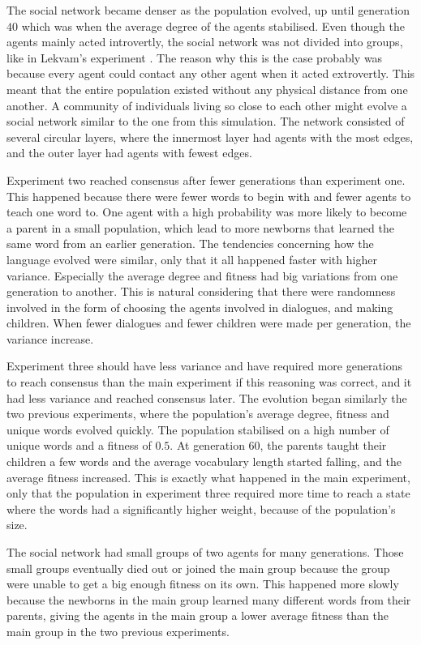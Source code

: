 The social network became denser as the population evolved, up until generation $40$ which was when the average degree of the agents stabilised. Even though the agents mainly acted introvertly, the social network was not divided into groups, like in Lekvam’s experiment \citep[Chapter 5, Section 1]{lekvam2014co}. The reason why this is the case probably was because every agent could contact any other agent when it acted extrovertly. This meant that the entire population existed without any physical distance from one another. A community of individuals living so close to each other might evolve a social network similar to the one from this simulation. The network consisted of several circular layers, where the innermost layer had agents with the most edges, and the outer layer had agents with fewest edges.

Experiment two reached consensus after fewer generations than experiment one. This happened because there were fewer words to begin with and fewer agents to teach one word to. One agent with a high probability was more likely to become a parent in a small population, which lead to more newborns that learned the same word from an earlier generation. The tendencies concerning how the language evolved were similar, only that it all happened faster with higher variance. Especially the average degree and fitness had big variations from one generation to another. This is natural considering that there were randomness involved in the form of choosing the agents involved in dialogues, and making children. When fewer dialogues and fewer children were made per generation, the variance increase.

Experiment three should have less variance and have required more generations to reach consensus than the main experiment if this reasoning was correct, and it had less variance and reached consensus later. The evolution began similarly the two previous experiments, where the population's average degree, fitness and unique words evolved quickly. The population stabilised on a high number of unique words and a fitness of $0.5$. At generation 60, the parents taught their children a few words and the average vocabulary length started falling, and the average fitness increased. This is exactly what happened in the main experiment, only that the population in experiment three required more time to reach a state where the words had a significantly higher weight, because of the population’s size. 

The social network had small groups of two agents for many generations. Those small groups eventually died out or joined the main group because the group were unable to get a big enough fitness on its own. This happened more slowly because the newborns in the main group learned many different words from their parents, giving the agents in the main group a lower average fitness than the main group in the two previous experiments.

